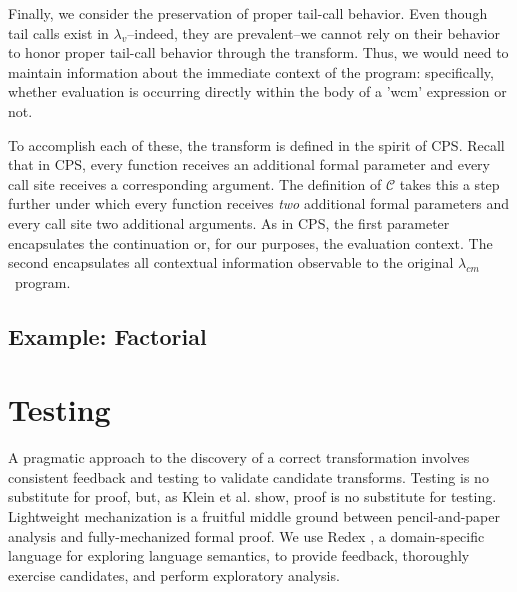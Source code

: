 \documentclass{llncs}
\newcommand{\cm}[0]{$\lambda_{cm}$}
\newcommand{\lv}[0]{$\lambda_v$}
\begin{document}
Finally, we consider the preservation of proper tail-call behavior. Even though tail calls exist in \lv--indeed, they are prevalent--we cannot rely on their behavior to honor proper tail-call behavior through the transform. Thus, we would need to maintain information about the immediate context of the program: specifically, whether evaluation is occurring directly within the body of a \scheme'wcm' expression or not.

To accomplish each of these, the transform is defined in the spirit of CPS. Recall that in
CPS, every function receives an additional formal parameter and every call site receives a
corresponding argument. The definition of $\mathcal{C}$ takes this a step further under
which every function receives \emph{two} additional formal parameters and every call site
two additional arguments. As in CPS, the first parameter encapsulates the continuation or,
for our purposes, the evaluation context. The second encapsulates all contextual
information observable to the original \cm\ program.


\subsection{Example: Factorial}

\section{Testing}

A pragmatic approach to the discovery of a correct transformation involves consistent feedback and testing to validate candidate transforms. Testing is no substitute for proof, but, as Klein et al. \cite{klein2012run} show, proof is no substitute for testing. Lightweight mechanization is a fruitful middle ground between pencil-and-paper analysis and fully-mechanized formal proof. We use Redex \cite{findler2010redex}, a domain-specific language for exploring language semantics, to provide feedback, thoroughly exercise candidates, and perform exploratory analysis.


\setspecialsymbol{->}{$\to$}
\setspecialsymbol{-->}{$\rightarrow$}
\end{document}
